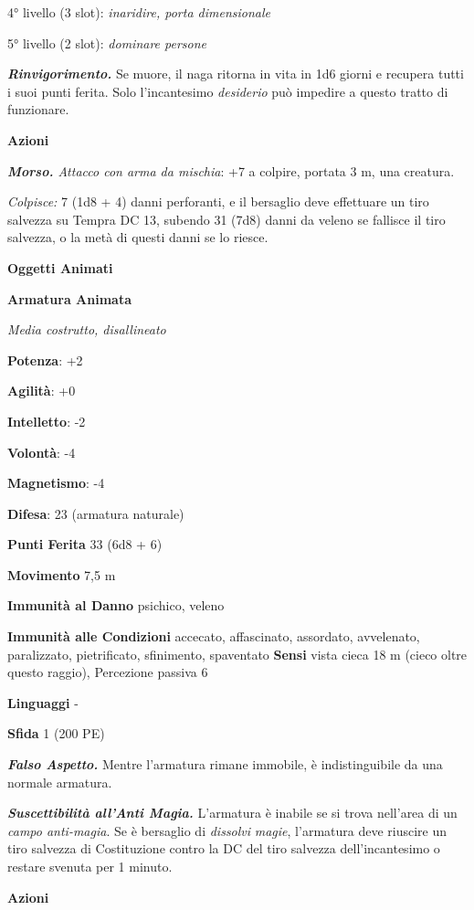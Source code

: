 \begin{multicols}{2}
4° livello (3 slot): \emph{inaridire, porta dimensionale}

5° livello (2 slot): \emph{dominare persone}

\emph{\textbf{Rinvigorimento.}} Se muore, il naga ritorna in vita in 1d6
giorni e recupera tutti i suoi punti ferita. Solo l'incantesimo
\emph{desiderio} può impedire a questo tratto di funzionare.

\textbf{Azioni}

\emph{\textbf{Morso.} Attacco con arma da mischia}: +7 a colpire,
portata 3 m, una creatura.

\emph{Colpisce:} 7 (1d8 + 4) danni perforanti, e il bersaglio deve
effettuare un tiro salvezza su Tempra DC 13, subendo 31 (7d8)
danni da veleno se fallisce il tiro salvezza, o la metà di questi danni
se lo riesce.

\textbf{Oggetti Animati}

\textbf{Armatura Animata}

\emph{Media costrutto, disallineato}

\textbf{Potenza}: +2

\textbf{Agilità}: +0

\textbf{Intelletto}: -2

\textbf{Volontà}: -4

\textbf{Magnetismo}: -4

\textbf{Difesa}: 23 (armatura naturale)

\textbf{Punti Ferita} 33 (6d8 + 6)

\textbf{Movimento} 7,5 m

\textbf{Immunità al Danno} psichico, veleno

\textbf{Immunità alle Condizioni} accecato, affascinato, assordato,
avvelenato, paralizzato, pietrificato, sfinimento, spaventato
\textbf{Sensi} vista cieca 18 m (cieco oltre questo raggio), Percezione
passiva 6

\textbf{Linguaggi} -

\textbf{Sfida} 1 (200 PE)

\emph{\textbf{Falso Aspetto.}} Mentre l'armatura rimane immobile, è
indistinguibile da una normale armatura.

\emph{\textbf{Suscettibilità all'Anti Magia.}} L'armatura è inabile se
si trova nell'area di un \emph{campo anti-magia}. Se è bersaglio di
\emph{dissolvi} \emph{magie}, l'armatura deve riuscire un tiro salvezza
di Costituzione contro la DC del tiro salvezza dell'incantesimo o
restare svenuta per 1 minuto.

\textbf{Azioni}


\end{multicols}
